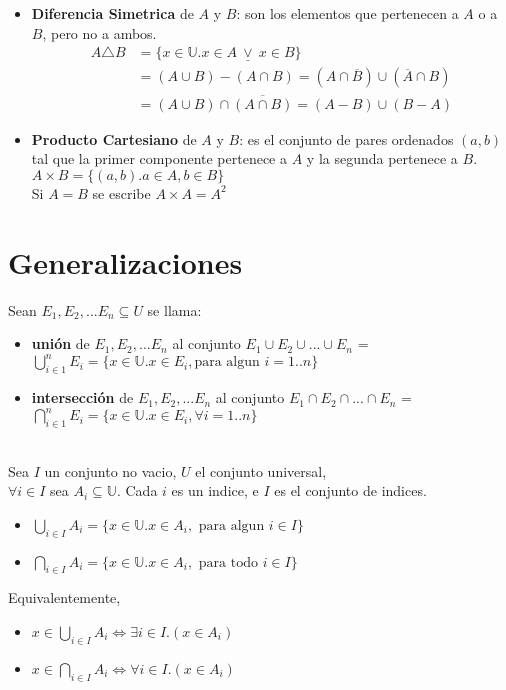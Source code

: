 \documentclass[11pt,a4paper]{article}
\begin{document}
\begin{itemize}
\noindent \dotfill
\item \textbf{Diferencia Simetrica} de $A$ y $B$: son los elementos que pertenecen a $A$ o a $B$, pero no a ambos.
\begin{align*}
A \triangle B 
&= \{x\in \mathbb{U} . x\in A\ \underline{\lor}\ x\in B\}\\
&= (A \cup B) - (A \cap B) = (A \cap \overline{B}) \cup (\overline{A} \cap B)\\
&= (A \cup B) \cap \overline{(A \cap B)} = (A-B) \cup (B-A)
\end{align*}

\noindent \dotfill
\item \textbf{Producto Cartesiano} de $A$ y $B$: es el conjunto de pares ordenados $(a,b)$ tal que la primer componente pertenece a $A$ y la segunda pertenece a $B$.\\
$A\times B = \{ (a,b) . a\in A, b\in B \}$\\
Si $A = B$ se escribe $A \times A = A^2$\\

\noindent \dotfill
\end{itemize}
\newpage

\section{Generalizaciones}
Sean $E_1, E_2,...E_n \subseteq U$ se llama:
\begin{itemize}
\item \textbf{uni\'on} de $E_1, E_2,...E_n$ al conjunto $E_1 \cup E_2 \cup ... \cup E_n$ = $\displaystyle{\bigcup_{i \in 1}^{n} E_i} = \{ x \in \mathbb{U} . x\in E_i, \text{para algun } i=1..n \}$
\item \textbf{intersecci\'on} de $E_1, E_2,...E_n$ al conjunto $E_1 \cap E_2 \cap ... \cap E_n$ = $\displaystyle{\bigcap_{i \in 1}^{n} E_i} = \{ x \in \mathbb{U} . x\in E_i, \forall i=1..n \}$
\end{itemize}
\noindent \dotfill\\

Sea $I$ un conjunto no vacio, $U$ el conjunto universal,\\
$\forall i \in I$ sea $A_i \subseteq \mathbb{U}$. Cada $i$ es un indice, e $I$ es el conjunto de indices.\\
\begin{itemize}
\item $\displaystyle{\bigcup_{i \in I} A_i} = \{ x \in \mathbb{U} . x\in A_i, \text{ para algun } i\in I \}$
\item $\displaystyle{\bigcap_{i \in I} A_i} = \{ x \in \mathbb{U} . x\in A_i, \text{ para todo } i\in I \}$
\end{itemize}
Equivalentemente,
\begin{itemize}
\item $x \in \displaystyle{\bigcup_{i \in I} A_i} \iff \exists i \in I . (x \in A_i)$
\item $x \in \displaystyle{\bigcap_{i \in I} A_i} \iff \forall i \in I . (x \in A_i)$
\end{itemize}
\noindent \dotfill\\
\end{document}
